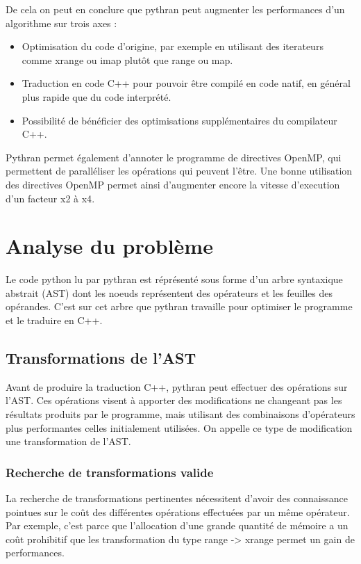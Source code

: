 \documentclass[a4paper]{article}
\begin{document}
De cela on peut en conclure que pythran peut augmenter les performances d'un algorithme sur trois axes :

\begin{itemize}
  \item Optimisation du code d'origine, par exemple en utilisant des iterateurs comme xrange ou imap plutôt que range ou map.
  \item Traduction en code C++ pour pouvoir être compilé en code natif, en général plus rapide que du code interprété.
  \item Possibilité de bénéficier des optimisations supplémentaires du compilateur C++.
\end{itemize}


Pythran permet également d'annoter le programme de directives OpenMP, qui permettent de paralléliser les opérations qui peuvent l'être. Une bonne utilisation des directives OpenMP permet ainsi d'augmenter encore la vitesse d'execution d'un facteur x2 à x4\cite{PythranRenpar}.

\section{Analyse du problème}

Le code python lu par pythran est réprésenté sous forme d'un arbre syntaxique abstrait (AST) dont les noeuds représentent des opérateurs et les feuilles des opérandes. C'est sur cet arbre que pythran travaille pour optimiser le programme et le traduire en C++.

\subsection{Transformations de l'AST}

Avant de produire la traduction C++, pythran peut effectuer des opérations sur l'AST. Ces opérations visent à apporter des modifications ne changeant pas les résultats produits par le programme, mais utilisant des combinaisons d'opérateurs plus performantes celles initialement utilisées. On appelle ce type de modification une transformation de l'AST.

\subsubsection{Recherche de transformations valide}

La recherche de transformations pertinentes nécessitent d'avoir des connaissance pointues sur le coût des différentes opérations effectuées par un même opérateur. Par exemple, c'est parce que l'allocation d'une grande quantité de mémoire a un coût prohibitif que les transformation du type range -> xrange permet un gain de performances.
\end{document}
